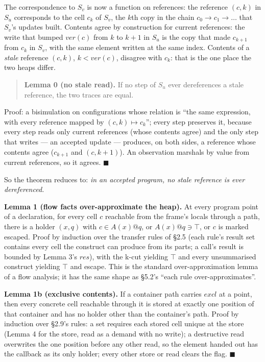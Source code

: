 The correspondence to $S_{v}$ is now a function on references: the reference $(c,\allowbreak{}k)$ in $S_{u}$ corresponds to the cell $c_{k}$ of $S_{v}$, the $k$th copy in the chain $c_{0}\to c_{1}\to \ldots$ that $S_{v}$'s updates built. Contents agree by construction for current references: the write that bumped $\mathit{ver}(c)$ from $k$ to $k+1$ in $S_{u}$ is the copy that made $c_{k+1}$ from $c_{k}$ in $S_{v}$, with the same element written at the same index. Contents of a \emph{stale} reference $(c,\allowbreak{}k)$, $k<\mathit{ver}(c)$, disagree with $c_{k}$: that is the one place the two heaps differ.

\begin{quote}
\textbf{Lemma 0 (no stale read).} If no step of $S_{u}$ ever dereferences a stale reference, the two traces are equal.
\end{quote}

Proof: a bisimulation on configurations whose relation is “the same expression, with every reference mapped by $(c,\allowbreak{}k)\mapsto c_{k}$”; every step preserves it, because every step reads only current references (whose contents agree) and the only step that writes — an accepted update — produces, on both sides, a reference whose contents agree ($c_{k+1}$ and $(c,\allowbreak{}k+1)$). An observation marshals by value from current references, so it agrees. $\blacksquare$

So the theorem reduces to: \emph{in an accepted program, no stale reference is ever dereferenced.}


\textbf{Lemma 1 (flow facts over-approximate the heap).} At every program point of a declaration, for every cell $c$ reachable from the frame's locals through a path, there is a holder $(x,\allowbreak{}q)$ with $c\in A(x)@q$, or $A(x)@q\ni \top$, or $c$ is marked escaped. Proof by induction over the transfer rules of §2.5 (each rule's result set contains every cell the construct can produce from its parts; a call's result is bounded by Lemma 3's $\mathit{res}$), with the k-cut yielding $\top$ and every unsummarised construct yielding $\top$ and escape. This is the standard over-approximation lemma of a flow analysis; it has the same shape as  §5.2's “each rule over-approximates”.

\textbf{Lemma 1b (exclusive contents).} If a container path carries $\mathit{excl}$ at a point, then every concrete cell reachable through it is stored at exactly one position of that container and has no holder other than the container's path. Proof by induction over §2.9's rules: a set requires each stored cell unique at the store (Lemma 4 for the store, read as a demand with no write); a destructive read overwrites the one position before any other read, so the element handed out has the callback as its only holder; every other store or read clears the flag. $\blacksquare$

